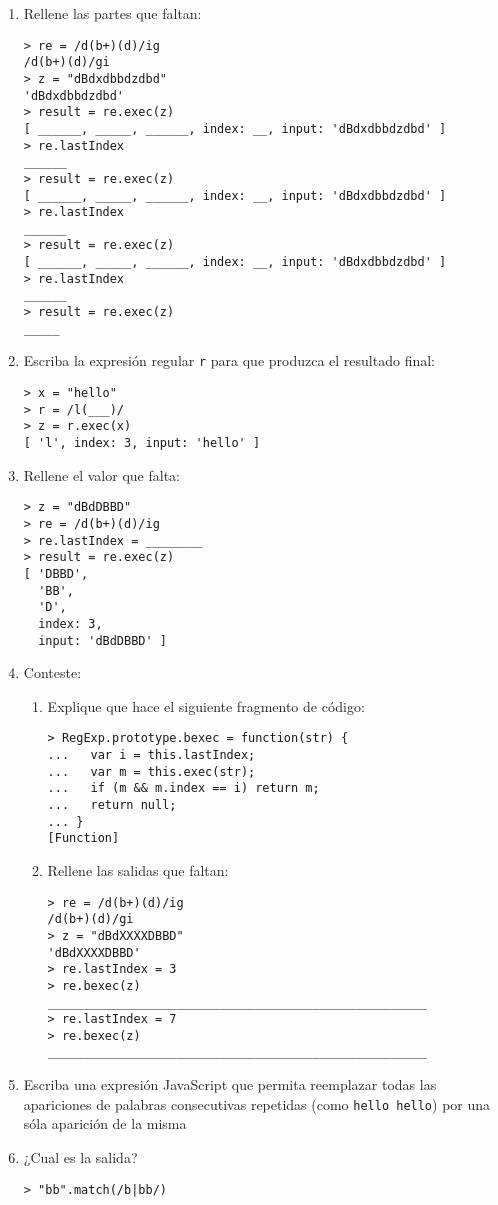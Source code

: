 \documentclass[spanish,a4paper,11pt]{article}
\begin{document}
\begin{enumerate}
\item  Rellene las partes que faltan:
\begin{verbatim}
> re = /d(b+)(d)/ig
/d(b+)(d)/gi
> z = "dBdxdbbdzdbd"
'dBdxdbbdzdbd'
> result = re.exec(z)
[ ______, _____, ______, index: __, input: 'dBdxdbbdzdbd' ]
> re.lastIndex
______
> result = re.exec(z)
[ ______, _____, ______, index: __, input: 'dBdxdbbdzdbd' ]
> re.lastIndex
______
> result = re.exec(z)
[ ______, _____, ______, index: __, input: 'dBdxdbbdzdbd' ]
> re.lastIndex
______
> result = re.exec(z)
_____
\end{verbatim}
\item Escriba la expresión regular \verb|r| para que produzca el resultado final:
\begin{verbatim}
> x = "hello"
> r = /l(___)/
> z = r.exec(x)
[ 'l', index: 3, input: 'hello' ]
\end{verbatim}
\item 
Rellene el valor que falta:
\begin{verbatim}
> z = "dBdDBBD"
> re = /d(b+)(d)/ig
> re.lastIndex = ________
> result = re.exec(z)
[ 'DBBD',
  'BB',
  'D',
  index: 3,
  input: 'dBdDBBD' ]
\end{verbatim}
\item  Conteste:
\begin{enumerate}
\item Explique que hace el siguiente fragmento de código:
\begin{verbatim}
> RegExp.prototype.bexec = function(str) {
...   var i = this.lastIndex;
...   var m = this.exec(str);
...   if (m && m.index == i) return m;
...   return null;
... }
[Function]
\end{verbatim}
\item Rellene las salidas que faltan:
\begin{verbatim}
> re = /d(b+)(d)/ig
/d(b+)(d)/gi
> z = "dBdXXXXDBBD"
'dBdXXXXDBBD'
> re.lastIndex = 3
> re.bexec(z)
_____________________________________________________
> re.lastIndex = 7
> re.bexec(z)
_____________________________________________________
\end{verbatim}
\end{enumerate}
\item 
Escriba una expresión JavaScript que permita reemplazar 
todas las apariciones de palabras consecutivas repetidas 
(como \verb|hello hello|)
por una sóla aparición de la misma
\item 
¿Cual es la salida? 
\begin{verbatim}
> "bb".match(/b|bb/)


\end{verbatim}
\end{enumerate}
\end{document}
